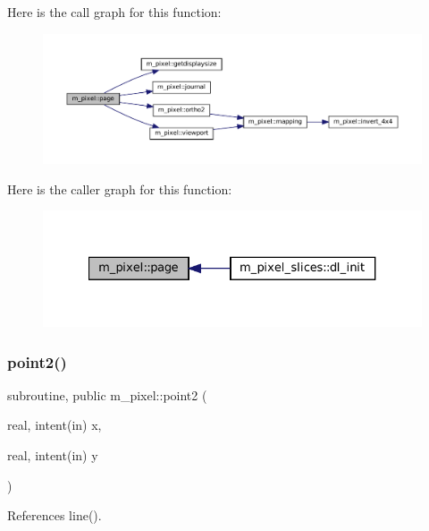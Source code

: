 Here is the call graph for this function\+:
\nopagebreak
\begin{figure}[H]
\begin{center}
\leavevmode
\includegraphics[width=350pt]{namespacem__pixel_a6733a8657ca9f51b2648690dbae258c9_cgraph}
\end{center}
\end{figure}
Here is the caller graph for this function\+:
\nopagebreak
\begin{figure}[H]
\begin{center}
\leavevmode
\includegraphics[width=327pt]{namespacem__pixel_a6733a8657ca9f51b2648690dbae258c9_icgraph}
\end{center}
\end{figure}
\mbox{\label{namespacem__pixel_a11234e0b33104eb0afb24f928b072053}} 
\subsubsection{\texorpdfstring{point2()}{point2()}}
{\footnotesize\ttfamily subroutine, public m\+\_\+pixel\+::point2 (\begin{DoxyParamCaption}\item[{real, intent(in)}]{x,  }\item[{real, intent(in)}]{y }\end{DoxyParamCaption})}



References line().

